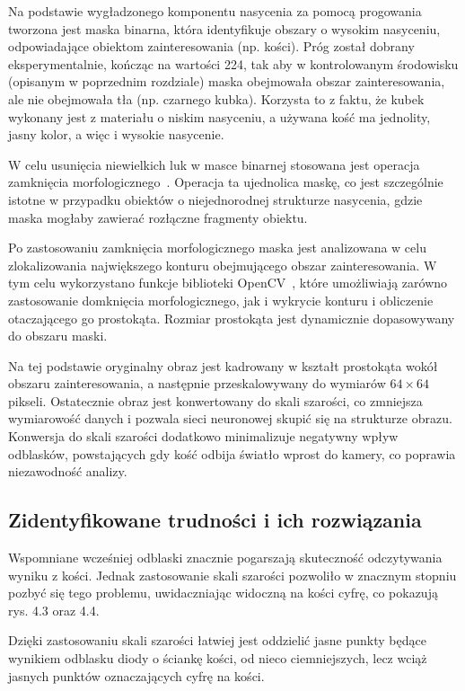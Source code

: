 Na podstawie wygładzonego komponentu nasycenia za pomocą progowania tworzona jest maska binarna,
która identyfikuje obszary o wysokim nasyceniu, odpowiadające obiektom zainteresowania (np. kości).
Próg został dobrany eksperymentalnie, kończąc na wartości 224,
tak aby w kontrolowanym środowisku (opisanym w poprzednim rozdziale) maska obejmowała obszar zainteresowania,
ale nie obejmowała tła (np. czarnego kubka).
Korzysta to z faktu, że kubek wykonany jest z materiału o niskim nasyceniu,
a używana kość ma jednolity, jasny kolor, a więc i wysokie nasycenie.

W celu usunięcia niewielkich luk w masce binarnej stosowana jest operacja zamknięcia morfologicznego~\cite{morphological_closure}.
Operacja ta ujednolica maskę, co jest szczególnie istotne w przypadku obiektów o niejednorodnej strukturze nasycenia,
gdzie maska mogłaby zawierać rozłączne fragmenty obiektu.

Po zastosowaniu zamknięcia morfologicznego maska jest analizowana w celu
zlokalizowania największego konturu obejmującego obszar zainteresowania.
W tym celu wykorzystano funkcje biblioteki OpenCV~\cite{opencv_docs},
które umożliwiają zarówno zastosowanie domknięcia morfologicznego, jak i wykrycie konturu i obliczenie otaczającego go prostokąta.
Rozmiar prostokąta jest dynamicznie dopasowywany do obszaru maski.

Na tej podstawie oryginalny obraz jest kadrowany w kształt prostokąta wokół obszaru zainteresowania,
a następnie przeskalowywany do wymiarów $64 \times 64$ pikseli.
Ostatecznie obraz jest konwertowany do skali szarości, co zmniejsza wymiarowość danych
i pozwala sieci neuronowej skupić się na strukturze obrazu.
Konwersja do skali szarości dodatkowo minimalizuje negatywny wpływ odblasków,
powstających gdy kość odbija światło wprost do kamery, co poprawia niezawodność analizy.



\subsection{Zidentyfikowane trudności i ich rozwiązania}\label{subsec:zidentyfikowane-trudnosci-i-ich-rozwiazania}

Wspomniane wcześniej odblaski znacznie pogarszają skuteczność odczytywania wyniku z kości.
Jednak zastosowanie skali szarości pozwoliło w znacznym stopniu pozbyć się tego problemu,
uwidaczniając widoczną na kości cyfrę, co pokazują rys. 4.3 oraz 4.4.

Dzięki zastosowaniu skali szarości łatwiej jest oddzielić jasne punkty będące wynikiem odblasku diody o ściankę kości,
od nieco ciemniejszych, lecz wciąż jasnych punktów oznaczających cyfrę na kości.

